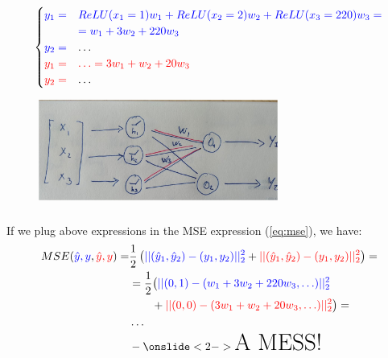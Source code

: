 \documentclass{beamer}
\begin{document}
\begin{frame}
    \frametitle{\insertsection}
    \framesubtitle{\insertsubsection}

    \begin{equation*}
        \begin{cases}
            \color{blue}y_1 =& \color{blue}ReLU(x_1=1)w_1+ReLU(x_2=2)w_2+ReLU(x_3=220)w_3 =\\
                             &\color{blue}= w_1 + 3w_2 + 220w_3\\
            \color{blue}y_2=& \ldots\\
            \color{red}y_1 =&\color{red} \ldots = 3w_1 + w_2 + 20w_3\\
            \color{red}y_2=& \ldots
        \end{cases}
    \end{equation*}

    \begin{figure}
        \centering
        \includegraphics[width=0.7\textwidth]{img/nn-relu.jpg}
        \caption{}
        \label{fig:nn-relu}
    \end{figure}
\end{frame}





\begin{frame}
    \frametitle{\insertsection}
    \framesubtitle{\insertsubsection}

    If we plug above expressions in the MSE expression (\ref{eq:mse}), we have:
    \begin{align*}
        MSE({\color{blue} \hat{y},y},{\color{red} \hat{y},y})=& \frac{1}{2}\left( {\color{blue} || (\hat{y}_1, \hat{y}_2) - (y_1,y_2) ||_2^2} + {\color{red}|| (\hat{y}_1, \hat{y}_2) - (y_1,y_2) ||_2^2 } \right)=\\
                                                  &= \frac{1}{2} \big( {\color{blue}|| (0,1)-(w_1+3w_2+220w_3, \ldots) ||_2^2}\\
                                                  & \qquad + {\color{red}|| (0,0) - (3w_1+w_2+20w_3,\ldots) ||_2^2}\big) =\\
                                                  & \ldots \\
                                                  &- \onslide<2->{\text{\huge A MESS!}}
    \end{align*}
\end{frame}
\end{document}

